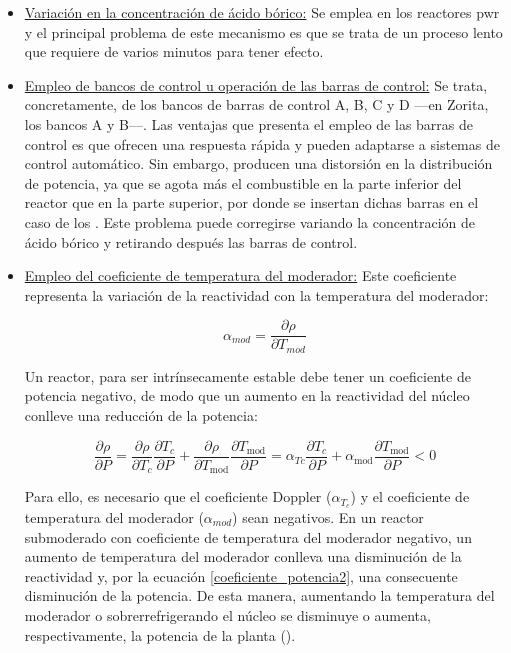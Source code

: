 \begin{itemize}
  \item \underline{Variación en la concentración de ácido bórico:} Se emplea en los reactores \acrshort{pwr} y el principal problema de este mecanismo es que se trata de un proceso lento que requiere de varios minutos para tener efecto.
  
  \item \underline{Empleo de bancos de control u operación de las barras de control:} 
  Se trata, concretamente, de los bancos de barras de control A, B, C y D ---en Zorita, los bancos A y B---. Las ventajas que presenta el empleo de las barras de control es que ofrecen una respuesta rápida y pueden adaptarse a sistemas de control automático. Sin embargo, producen una distorsión en la distribución de potencia, ya que se agota más el combustible en la parte inferior del reactor que en la parte superior, por donde se insertan dichas barras en el caso de los . Este problema puede corregirse variando la concentración de ácido bórico y retirando después las barras de control.

  \item \underline{Empleo del coeficiente de temperatura del moderador:} Este coeficiente representa la variación de la \gls{reactividad} con la temperatura del moderador: 
  
  \begin{equation}
    \alpha_{mod}=\frac{\partial \rho}{\partial T_{mod}}
  \end{equation}

  Un reactor, para ser intrínsecamente estable debe tener un coeficiente de potencia negativo, de modo que un aumento en la reactividad del núcleo conlleve una reducción de la potencia:

  \begin{equation} \label{coeficiente_potencia2}
    \frac{\partial \rho}{\partial P}=\frac{\partial \rho}{\partial T_c} \frac{\partial T_c}{\partial P}+\frac{\partial \rho}{\partial T_{\mathrm{mod}}} \frac{\partial T_{\mathrm{mod}}}{\partial P}=\alpha_{T c} \frac{\partial T_c}{\partial P}+\alpha_{\mathrm{mod}} \frac{\partial T_{\mathrm{mod}}}{\partial P}<0
  \end{equation}

  Para ello, es necesario que el coeficiente Doppler ($\alpha_{T_{c}}$) y el coeficiente de temperatura del moderador ($\alpha_{mod}$) sean negativos. En un reactor submoderado con coeficiente de temperatura del moderador negativo, un aumento de temperatura del moderador conlleva una disminución de la \gls{reactividad} y, por la ecuación \ref{coeficiente_potencia2}, una consecuente disminución de la potencia. De esta manera, aumentando la temperatura del moderador o sobrerrefrigerando el núcleo se disminuye o aumenta, respectivamente, la potencia de la planta (\cite{apuntes_centrales}).
  

\end{itemize}
